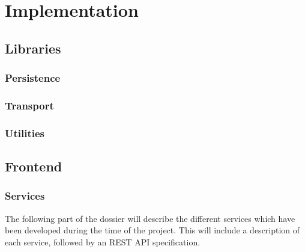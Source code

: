 

\chapter{Implementation}\label{ch:implementation}

\lipsum[2-4]


\section{Libraries}\label{sec:libraries}

\subsection{Persistence}\label{subsec:persistence}


\subsection{Transport}\label{subsec:transport}

\subsection{Utilities}\label{subsec:utilities}


\section{Frontend}\label{sec:frontend}

\subsection{Services}\label{subsec:services}

The following part of the dossier will describe the different services which have been developed during the time of the project.
This will include a description of each service, followed by an REST API specification.

